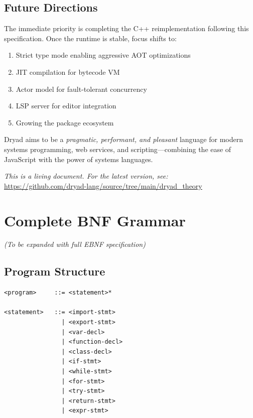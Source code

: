 \documentclass[12pt,a4paper]{article}
\theoremstyle{definition}
\begin{document}
\subsection{Future Directions}

The immediate priority is completing the C++ reimplementation following this specification. Once the runtime is stable, focus shifts to:
\begin{enumerate}[leftmargin=*]
    \item Strict type mode enabling aggressive AOT optimizations
    \item JIT compilation for bytecode VM
    \item Actor model for fault-tolerant concurrency
    \item LSP server for editor integration
    \item Growing the package ecosystem
\end{enumerate}

Dryad aims to be a \textit{pragmatic, performant, and pleasant} language for modern systems programming, web services, and scripting—combining the ease of JavaScript with the power of systems languages.

\vspace{1cm}

\begin{center}
\textit{This is a living document. For the latest version, see:}\\
\url{https://github.com/dryad-lang/source/tree/main/dryad_theory}
\end{center}

\newpage

\appendix

\section{Complete BNF Grammar}

\textit{(To be expanded with full EBNF specification)}

\subsection{Program Structure}

\begin{verbatim}
<program>     ::= <statement>*

<statement>   ::= <import-stmt>
                | <export-stmt>
                | <var-decl>
                | <function-decl>
                | <class-decl>
                | <if-stmt>
                | <while-stmt>
                | <for-stmt>
                | <try-stmt>
                | <return-stmt>
                | <expr-stmt>
\end{verbatim}
\end{document}
